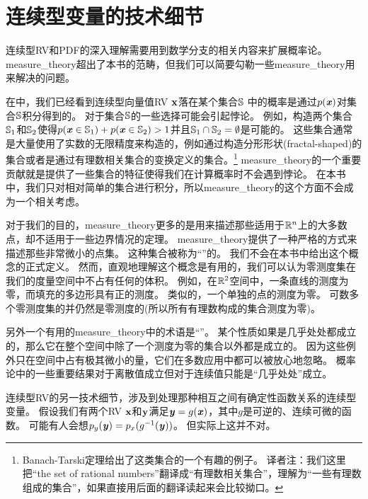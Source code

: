 \section{连续型变量的技术细节}
\label{sec:technical_details_of_continuous_variables}

连续型\gls{RV}和\gls{PDF}的深入理解需要用到数学分支的相关内容来扩展概率论。
\gls{measure_theory}超出了本书的范畴，但我们可以简要勾勒一些\gls{measure_theory}用来解决的问题。

在中，我们已经看到连续型向量值\gls{RV} $\mathbf{x}$落在某个集合$\mathbb{S}$ 中的概率是通过$p(\boldsymbol{\mathit{x}})$对集合$\mathbb{S}$积分得到的。
对于集合$\mathbb{S}$的一些选择可能会引起悖论。
例如，构造两个集合$\mathbb{S}_1$和$\mathbb{S}_2$使得$p(\boldsymbol{\mathit{x}}\in \mathbb{S}_1) + p(\boldsymbol{\mathit{x}}\in \mathbb{S}_2)>1$并且$\mathbb{S}_1 \cap \mathbb{S}_2 = \emptyset$是可能的。
这些集合通常是大量使用了实数的无限精度来构造的，例如通过构造分形形状(fractal-shaped)的集合或者是通过有理数相关集合的变换定义的集合。\footnote{Banach-Tarski定理给出了这类集合的一个有趣的例子。
译者注：我们这里把``the set of rational numbers''翻译成``有理数相关集合''，理解为``一些有理数组成的集合''，如果直接用后面的翻译读起来会比较拗口。}
\gls{measure_theory}的一个重要贡献就是提供了一些集合的特征使得我们在计算概率时不会遇到悖论。
在本书中，我们只对相对简单的集合进行积分，所以\gls{measure_theory}的这个方面不会成为一个相关考虑。


对于我们的目的，\gls{measure_theory}更多的是用来描述那些适用于$\mathbb{R}^n$上的大多数点，却不适用于一些边界情况的定理。
\gls{measure_theory}提供了一种严格的方式来描述那些非常微小的点集。
这种集合被称为``''的。
我们不会在本书中给出这个概念的正式定义。
然而，直观地理解这个概念是有用的，我们可以认为零测度集在我们的度量空间中不占有任何的体积。
例如，在$\mathbb{R}^2$空间中，一条直线的测度为零，而填充的多边形具有正的测度。
类似的，一个单独的点的测度为零。
可数多个零测度集的并仍然是零测度的(所以所有有理数构成的集合测度为零)。

另外一个有用的\gls{measure_theory}中的术语是``''。
某个性质如果是几乎处处都成立的，那么它在整个空间中除了一个测度为零的集合以外都是成立的。
因为这些例外只在空间中占有极其微小的量，它们在多数应用中都可以被放心地忽略。
概率论中的一些重要结果对于离散值成立但对于连续值只能是``几乎处处''成立。

连续型\gls{RV}的另一技术细节，涉及到处理那种相互之间有确定性函数关系的连续型变量。
假设我们有两个\gls{RV} $\mathbf{x}$和$\mathbf{y}$满足$\boldsymbol{\mathit{y}} = g(\boldsymbol{\mathit{x}})$，其中$g$是可逆的、连续可微的函数。
可能有人会想$p_y(\boldsymbol{\mathit{y}}) = p_x(g^{-1}(\boldsymbol{\mathit{y}}))$。
但实际上这并不对。

